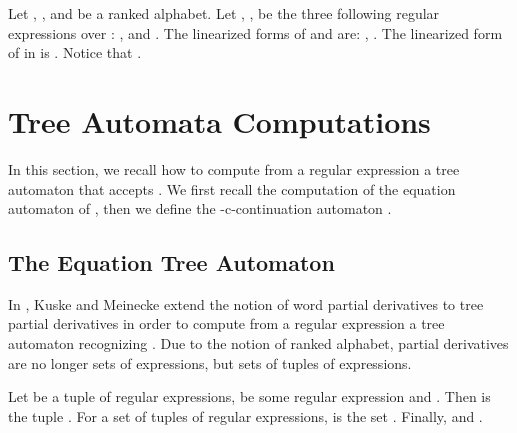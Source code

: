 \documentclass{llncs}
\begin{document}
\begin{example}\label{exp}
Let ,   ,  and  be a ranked alphabet.  Let , ,  be the three following regular expressions over : ,   and . The linearized forms of  and  are: , . The linearized form of  in  is . Notice that .
\end{example}

\section{Tree Automata Computations}\label{sec tree automata}

In this section, we recall how to compute from a regular expression  a tree automaton that accepts . We first recall the computation of the equation automaton  of , then we define the -c-continuation automaton .

\subsection{The Equation Tree Automaton}

  In \cite{automate2}, Kuske and Meinecke extend the notion of word partial derivatives \cite{antimirov} to tree partial derivatives in order to compute from a regular expression  a tree automaton recognizing . Due to the notion of  ranked alphabet, partial derivatives are no longer sets of expressions, but sets of tuples of expressions.
  
Let  be a tuple of regular expressions,  be some regular expression and . Then  is the tuple . For  a set of tuples of regular expressions,  is the set . Finally,  and .

\end{document}
